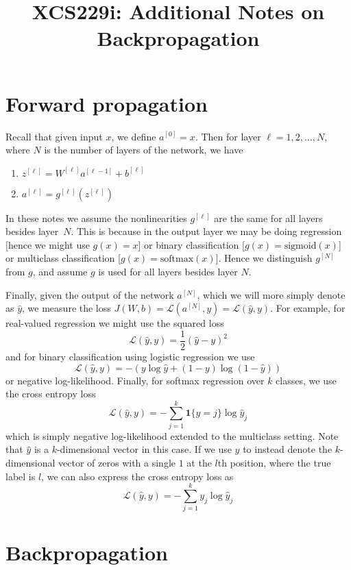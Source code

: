 \documentclass{article}
\numberwithin{equation}{section}
\begin{document}
\title{XCS229i: Additional Notes on Backpropagation}
\date{}
\maketitle

\section{Forward propagation}

Recall that given input $x$, we define $a^{[0]} = x$.
Then for layer $\ell = 1,2,\dots,N$, where $N$ is the number of layers of
the network, we have
\begin{enumerate}
  \item $z^{[\ell]} = W^{[\ell]} a^{[\ell-1]} + b^{[\ell]}$
  \item $a^{[\ell]} = g^{[\ell]}(z^{[\ell]})$
\end{enumerate}
In these notes we assume the nonlinearities $g^{[\ell]}$ are the same for all layers
besides layer~$N$. This is because in the output layer we may be doing
regression [hence we might use $g(x) = x$] or binary classification
[$g(x) = \text{sigmoid}(x)$] or multiclass classification [$g(x) = \text{softmax}(x)$].
Hence we distinguish $g^{[N]}$ from $g$, and assume $g$ is used for all layers besides layer $N$.

Finally, given the output of the network $a^{[N]}$, which we will more simply denote as
$\hat{y}$, we measure the loss
$J(W, b) = \mathcal{L}(a^{[N]}, y) = \mathcal{L}(\hat{y}, y)$. For example, for real-valued regression we might use
the squared loss
$$\mathcal{L}(\hat{y}, y) = \frac{1}{2}(\hat{y} - y)^2$$
and for binary classification using logistic regression we use
$$\mathcal{L}(\hat{y}, y) = -(y \log \hat{y} + (1-y) \log(1-\hat{y}))$$
or negative log-likelihood. Finally, for softmax regression over $k$ classes, we use
the cross entropy loss
$$\mathcal{L}(\hat{y}, y) = -\sum_{j=1}^k \mathbf{1}\{y=j\} \log \hat{y}_j$$
which is simply negative log-likelihood extended to the multiclass setting.
Note that $\hat{y}$ is a $k$-dimensional vector in this case.
If we use $y$ to instead denote the $k$-dimensional vector of zeros with
a single $1$ at the $l$th position, where the true label is $l$, we can also
express the cross entropy loss as
$$\mathcal{L}(\hat{y}, y) = -\sum_{j=1}^k y_j \log \hat{y}_j$$

\section{Backpropagation}
\end{document}
